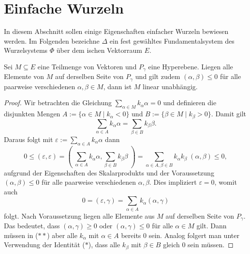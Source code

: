 \section{Einfache Wurzeln}
\label{sec:einfach}

In diesem Abschnitt sollen einige Eigenschaften einfacher Wurzeln bewiesen werden.  
Im Folgenden bezeichne $\Delta$ ein fest gewähltes Fundamentalsystem des Wurzelsystems $\Phi$ über dem \euklid ischen Vektorraum $E$.

\begin{lem}
  \label{lem:independentSet}
  Sei $M \subseteq E$ eine Teilmenge von Vektoren und $P_\gamma$ eine Hyperebene.
  Liegen alle Elemente von $M$ auf derselben Seite von $P_\gamma$ und gilt zudem $(\alpha, \beta) \leq 0$ für alle paarweise verschiedenen $\alpha, \beta \in M$, dann ist $M$ linear unabhängig.
\end{lem}

\begin{proof}
  Wir betrachten die Gleichung $\sum_{\alpha \in M} k_\alpha \alpha = 0$ und definieren die disjunkten Mengen $A := \{\alpha \in M \mid k_\alpha < 0\}$ und  $B := \{\beta \in M \mid k_\beta > 0\}$. 
  Damit gilt 
  \begin{displaymath}
    \sum_{\alpha \in A} k_\alpha \alpha = \sum_{\beta \in B} k_\beta \beta \tag{$\ast$}.
  \end{displaymath}
  Daraus folgt mit $\varepsilon := \sum_{\alpha \in A} k_\alpha \alpha$ dann
  \begin{displaymath}
    0 
    \leq (\varepsilon, \varepsilon) 
    = (\;\sum_{\alpha \in A} k_\alpha \alpha,\sum_{\beta \in B} k_\beta \beta\;) 
    = \sum_{\alpha \in A, \beta \in B} k_\alpha k_\beta \; (\alpha, \beta) 
    \leq 0,
  \end{displaymath}
  aufgrund der Eigenschaften des Skalarprodukts und der Voraussetzung $(\alpha, \beta) \leq 0$ für alle paarweise verschiedenen $\alpha, \beta$.
  Dies impliziert $\varepsilon = 0$, womit auch 
  \begin{displaymath}
    0 = (\varepsilon, \gamma) = \sum_{\alpha \in A} k_\alpha (\alpha, \gamma) \tag{$\ast\ast$}
  \end{displaymath}
  folgt. 
  Nach Voraussetzung liegen alle Elemente aus $M$ auf derselben Seite von $P_\gamma$. 
  Das bedeutet, dass $(\alpha, \gamma) \geq 0$ oder $(\alpha, \gamma) \leq 0$ für alle $\alpha \in M$ gilt.
  Dann müssen in ($\ast\ast$) aber alle $k_\alpha$ mit $\alpha \in A$ bereits $0$ sein.
  Analog folgert man unter Verwendung der Identität ($\ast$), dass alle $k_\beta$ mit $\beta \in B$ gleich $0$ sein müssen.
\end{proof}

